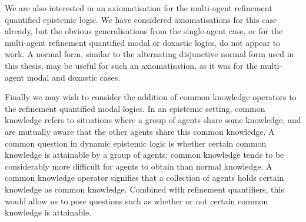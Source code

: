 We are also interested in an axiomatisation for the multi-agent refinement
quantified epistemic logic. We have considered axiomatisations for this case
already, but the obvious generalisations from the single-agent case, or for the
multi-agent refinement quantified modal or doxastic logics, do not appear to
work.  A normal form, similar to the alternating disjunctive normal form used in
this thesis, may be useful for such an axiomatisation, as it was for the
multi-agent modal and doxastic cases.

Finally we may wish to consider the addition of common knowledge operators to
the refinement quantified modal logics. In an epistemic setting, common
knowledge refers to situations where a group of agents share some knowledge, and
are mutually aware that the other agents share this common knowledge. A common
question in dynamic epistemic logic is whether certain common knowledge is
attainable by a group of agents; common knowledge tends to be considerably more
difficult for agents to obtain than normal knowledge. A common knowledge
operator signifies that a collection of agents holds certain knowledge as common
knowledge. Combined with refinement quantifiers, this would allow us to pose
questions such as whether or not certain common knowledge is attainable.
